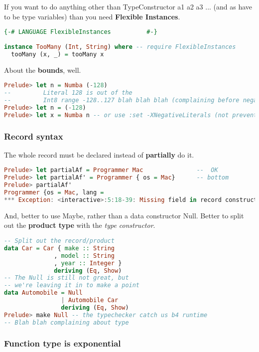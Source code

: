 \documentclass{article}
\begin{document}
If you want to do anything other than \colorbox{black!10}{\selectfont TypeConstructor a1 a2 a3} ... (and as have to be type variables) than you need \textbf{Flexible Instances}.
\begin{lstlisting}[language = Haskell]
{-# LANGUAGE FlexibleInstances          #-}
  
instance TooMany (Int, String) where -- require FlexibleInstances
  tooMany (x, _) = tooMany x
\end{lstlisting}

About the \textbf{bounds}, well.
\begin{lstlisting}[language = Haskell]
Prelude> let n = Numba (-128)
--         Literal 128 is out of the
--         Int8 range -128..127 blah blah blah (complaining before negate)
Prelude> let n = (-128)
Prelude> let x = Numba n -- or use :set -XNegativeLiterals (not prevent the warnings)
\end{lstlisting}

\subsubsection*{Record syntax}
The whole record must be declared instead of \textbf{partially} do it.
\begin{lstlisting}[language = Haskell]
Prelude> let partialAf = Programmer Mac               --  OK
Prelude> let partialAf' = Programmer { os = Mac}      -- bottom
Prelude> partialAf'
Programmer {os = Mac, lang = 
*** Exception: <interactive>:5:18-39: Missing field in record construction lang \end{lstlisting}

And, better to use {\selectfont \textcolor{RubineRed}{Maybe}}, rather than a data constructor {\selectfont Null}. Better to split out the \textbf{product type} with the \textit{type constructor}.

\begin{lstlisting}[language = Haskell]
-- Split out the record/product
data Car = Car { make :: String
              , model :: String
              , year :: Integer }
              deriving (Eq, Show)
-- The Null is still not great, but
-- we're leaving it in to make a point
data Automobile = Null
                | Automobile Car
                deriving (Eq, Show)  
Prelude> make Null -- the typechecker catch us b4 runtime
-- Blah blah complaining about type
\end{lstlisting}

\subsubsection*{Function type is exponential}
\end{document}
